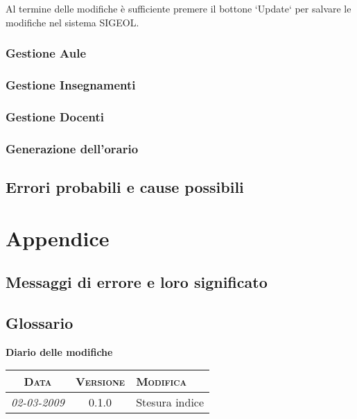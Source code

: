 \documentclass[11pt,a4paper]{article}
\newcommand{\modifiche} 
{
\newpage
\begin{center}
\textbf{Diario delle modifiche} \\
\bigskip
\begin{tabular}{|c|c|p{0.62\textwidth}|}
\hline
\textsc{Data} & \textsc{Versione} & \textsc{Modifica} \\
\hline
\hline
\textit{02-03-2009} & 0.1.0 & Stesura indice\\
\hline
\end{tabular}
\end{center}
}
\begin{document}
Al termine delle modifiche è sufficiente premere il bottone `Update` per salvare le modifiche nel sistema SIGEOL.
\subsubsection{Gestione Aule}
\subsubsection{Gestione Insegnamenti}
\subsubsection{Gestione Docenti}
\subsubsection{Generazione dell'orario}


\subsection{Errori probabili e cause possibili}
\section{Appendice}
\subsection{Messaggi di errore e loro significato}
\subsection{Glossario}




\modifiche
\end{document}
